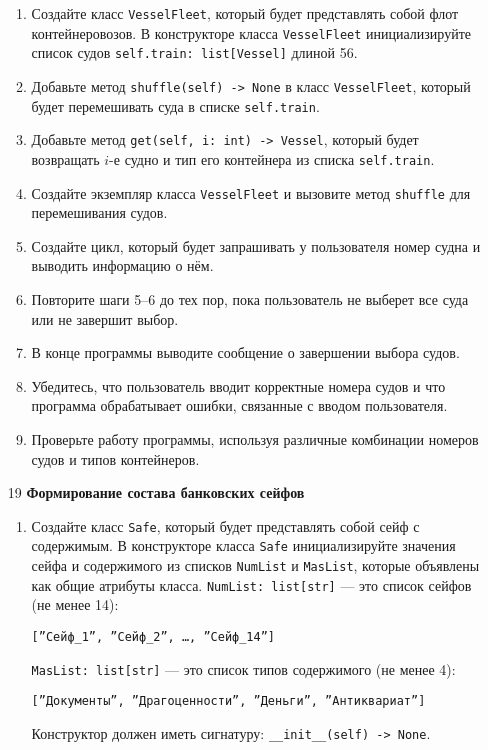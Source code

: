 \begin{enumerate}
\begin{enumerate}
    \item Создайте класс \texttt{VesselFleet}, который будет представлять собой флот контейнеровозов. В конструкторе класса \texttt{VesselFleet} инициализируйте список судов \texttt{self.train: list[Vessel]} длиной 56.

    \item Добавьте метод \texttt{shuffle(self) -> None} в класс \texttt{VesselFleet}, который будет перемешивать суда в списке \texttt{self.train}.

    \item Добавьте метод \texttt{get(self, i: int) -> Vessel}, который будет возвращать $i$-е судно и тип его контейнера из списка \texttt{self.train}.

    \item Создайте экземпляр класса \texttt{VesselFleet} и вызовите метод \texttt{shuffle} для перемешивания судов.

    \item Создайте цикл, который будет запрашивать у пользователя номер судна и выводить информацию о нём.

    \item Повторите шаги 5–6 до тех пор, пока пользователь не выберет все суда или не завершит выбор.

    \item В конце программы выводите сообщение о завершении выбора судов.

    \item Убедитесь, что пользователь вводит корректные номера судов и что программа обрабатывает ошибки, связанные с вводом пользователя.

    \item Проверьте работу программы, используя различные комбинации номеров судов и типов контейнеров.
\end{enumerate}

\item[19] \textbf{Формирование состава банковских сейфов}
\begin{enumerate}
    \item Создайте класс \texttt{Safe}, который будет представлять собой сейф с содержимым. В конструкторе класса \texttt{Safe} инициализируйте значения сейфа и содержимого из списков \texttt{NumList} и \texttt{MasList}, которые объявлены как общие атрибуты класса. \texttt{NumList: list[str]} — это список сейфов (не менее 14): 
    \begin{center}
        \texttt{[''Сейф\_1'', ''Сейф\_2'', \dots, ''Сейф\_14'']}
    \end{center}
    \texttt{MasList: list[str]} — это список типов содержимого (не менее 4):
    \begin{center}
        \texttt{[''Документы'', ''Драгоценности'', ''Деньги'', ''Антиквариат'']}
    \end{center}
    Конструктор должен иметь сигнатуру: \texttt{\_\_init\_\_(self) -> None}.


\end{enumerate}
\end{enumerate}
